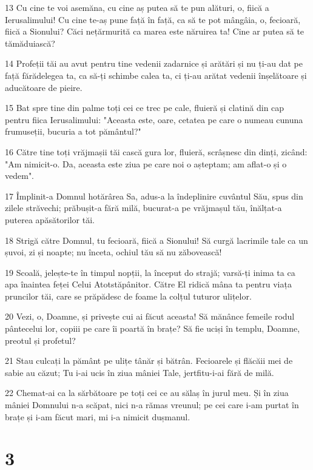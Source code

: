 \par 13 Cu cine te voi asemăna, cu cine aș putea să te pun alături, o, fiică a Ierusalimului! Cu cine te-aș pune față în față, ca să te pot mângâia, o, fecioară, fiică a Sionului? Căci nețărmurită ca marea este năruirea ta! Cine ar putea să te tămăduiască?
\par 14 Profeții tăi au avut pentru tine vedenii zadarnice și arătări și nu ți-au dat pe față fărădelegea ta, ca să-ți schimbe calea ta, ci ți-au arătat vedenii înșelătoare și aducătoare de pieire.
\par 15 Bat spre tine din palme toți cei ce trec pe cale, fluieră și clatină din cap pentru fiica Ierusalimului: "Aceasta este, oare, cetatea pe care o numeau cununa frumuseții, bucuria a tot pământul?"
\par 16 Către tine toți vrăjmașii tăi cască gura lor, fluieră, scrâșnesc din dinți, zicând: "Am nimicit-o. Da, aceasta este ziua pe care noi o așteptam; am aflat-o și o vedem".
\par 17 Împlinit-a Domnul hotărârea Sa, adus-a la îndeplinire cuvântul Său, spus din zilele străvechi; prăbușit-a fără milă, bucurat-a pe vrăjmașul tău, înălțat-a puterea apăsătorilor tăi.
\par 18 Strigă către Domnul, tu fecioară, fiică a Sionului! Să curgă lacrimile tale ca un șuvoi, zi și noapte; nu înceta, ochiul tău să nu zăbovească!
\par 19 Scoală, jelește-te în timpul nopții, la început do strajă; varsă-ți inima ta ca apa înaintea feței Celui Atotstăpânitor. Către El ridică mâna ta pentru viața pruncilor tăi, care se prăpădesc de foame la colțul tuturor ulițelor.
\par 20 Vezi, o, Doamne, și privește cui ai făcut aceasta! Să mănânce femeile rodul pântecelui lor, copiii pe care îi poartă în brațe? Să fie uciși în templu, Doamne, preotul și profetul?
\par 21 Stau culcați la pământ pe ulițe tânăr și bătrân. Fecioarele și flăcăii mei de sabie au căzut; Tu i-ai ucis în ziua mâniei Tale, jertfitu-i-ai fără de milă.
\par 22 Chemat-ai ca la sărbătoare pe toți cei ce au sălaș în jurul meu. Și în ziua mâniei Domnului n-a scăpat, nici n-a rămas vreunul; pe cei care i-am purtat în brațe și i-am făcut mari, mi i-a nimicit dușmanul.

\chapter{3}

